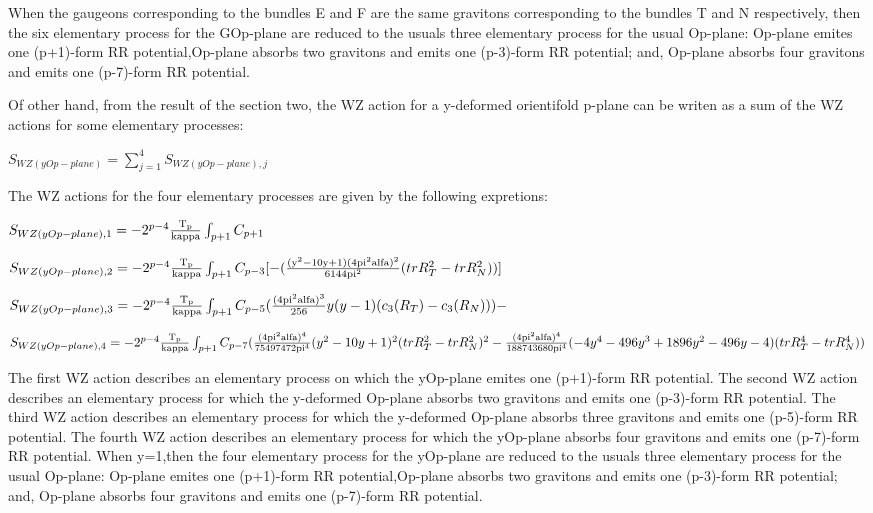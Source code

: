 \documentclass[a4paper,a4paper]{article}
\begin{document}
When the gaugeons corresponding to the bundles E and F are the same gravitons corresponding to the bundles T and N respectively, then the six elementary process for the GOp-plane are reduced to the usuals three elementary process for the usual Op-plane: Op-plane emites one (p+1)-form RR potential,Op-plane
absorbs two gravitons and emits one (p-3)-form RR potential; and, Op-plane absorbs four gravitons and emits one (p-7)-form RR potential.


Of other hand, from the result of the section two, the WZ action for a y-deformed orientifold p-plane can be writen as a sum of the WZ actions for some elementary processes:
\begin{center}
{  $ S_{WZ(yOp-plane)} = \sum_{j=1}^{4}S_{WZ(yOp-plane),j} $ }
\end{center}
The WZ actions for the four elementary processes are given by the following 
expretions:
\begin{center}
{  $ S_{WZ(yOp-plane),1} = -2^{p-4}\frac{\rm T_p}{\rm kappa}\int_{p+1} C_{p+1}$ }
\end{center} 
\begin{center}
{  $ S_{WZ(yOp-plane),2} = -2^{p-4}\frac{\rm T_p}{\rm kappa}\int_{p+1} C_{p-3}[-({\frac{\rm(y^2-10y+1)(4pi^2alfa)^2 }{\rm 6144pi^2}}{(trR_T^2- trR_N^2)})]$ }
\end{center}
\begin{center}
{  $ S_{WZ(yOp-plane),3} = -2^{p-4}\frac{\rm T_p}{\rm kappa}\int_{p+1} C_{p-5}(\frac{\rm (4pi^2alfa)^3}{\rm 256}{{y(y-1)(c_3(R_T)- c_3(R_N)))}}-$ }
\end{center}
\begin{center}
{  $ S_{WZ(yOp-plane),4} = -2^{p-4}\frac{\rm T_p}{\rm kappa}\int_{p+1} C_{p-7}(\frac{\rm (4pi^2alfa)^4}{\rm 75497472pi^4}{{(y^2-10y+1)^2(trR_T^2-trR_N^2)^2}}-\frac{\rm(4pi^2alfa)^4 }{\rm 188743680pi^4}{(-4y^4-496y^3+1896y^2-496y-4)(trR_T^4- trR_N^4)})$ }
\end{center}

The first WZ action describes an elementary process on which the yOp-plane emites one (p+1)-form RR potential.
The second WZ action describes an elementary process for which the y-deformed
Op-plane absorbs two gravitons and emits one (p-3)-form RR potential.
The third WZ action describes an elementary process for which the y-deformed
Op-plane absorbs three gravitons and emits one (p-5)-form RR potential.
The fourth WZ action describes an elementary process for which the yOp-plane absorbs four gravitons and emits one (p-7)-form RR potential.
When y=1,then the four elementary process for the yOp-plane are reduced to the usuals three elementary process for the usual Op-plane: Op-plane emites one (p+1)-form RR potential,Op-plane
absorbs two gravitons and emits one (p-3)-form RR potential; and, Op-plane absorbs four gravitons and emits one (p-7)-form RR potential.
 
\end{document}
